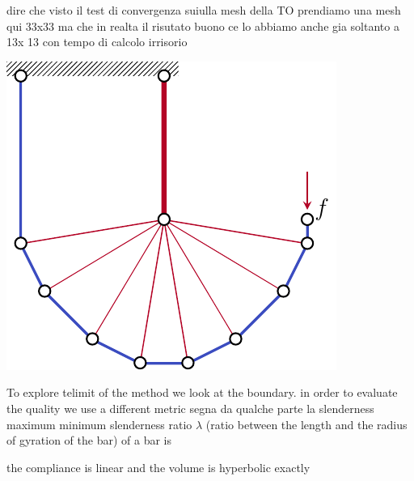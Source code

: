 dire che visto il test di convergenza suiulla mesh della TO prendiamo una mesh qui 33x33 ma che in realta il risutato buono ce lo abbiamo anche gia soltanto a 13x 13 con tempo di calcolo irrisorio
\begin{marginfigure}
    \centering
    \includegraphics[width=0.8\linewidth]{figures/03_comparison_TO_TTO/05b_tto_sol_13/L_tto_opt.pdf}
    \caption{}
    \label{fig:03_L_tto_13}
\end{marginfigure}

To explore telimit of the method we look at the boundary. in order to evaluate the quality we use a different metric
segna da qualche parte la slenderness maximum
minimum slenderness ratio $\lambda$ (ratio between the length and the radius of gyration of the bar) of a bar is

the compliance is linear and the volume is hyperbolic exactly

